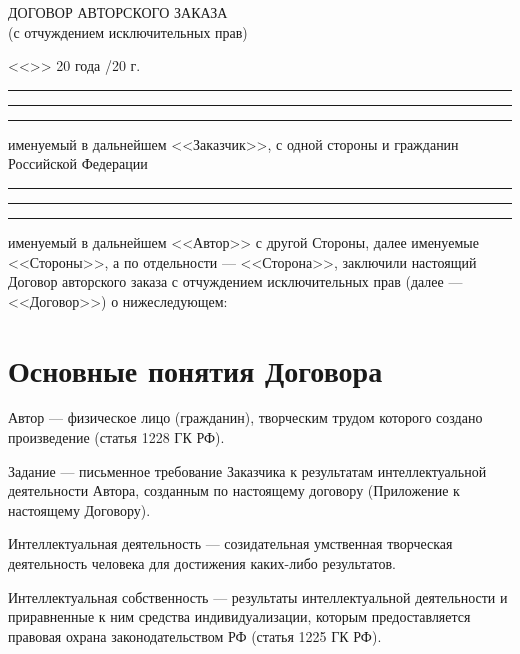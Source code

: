 \documentclass[12pt]{article}
\begin{document}
\begin{center}
{\Large \MakeUppercase{Договор авторского заказа} \\
(с отчуждением исключительных прав)}
\end{center}

\vspace{.5cm}

\noindent <<\underline{\hspace{0.75cm}}>> \underline{\hspace{3cm}} 20\underline{\hspace{0.75cm}} года /20\underline{\hspace{0.75cm}} г.  \underline{\hspace{3cm}}

\vspace{12pt}
\hrule height .1mm\vspace{12pt}
\hrule height .1mm\vspace{12pt}
\hrule height .1mm\vspace{12pt}

именуемый в дальнейшем <<Заказчик>>, с одной стороны и
гражданин Российской Федерации

\vspace{12pt}
\hrule height .1mm\vspace{12pt}
\hrule height .1mm\vspace{12pt}
\hrule height .1mm\vspace{12pt}

именуемый в дальнейшем <<Автор>> с другой Стороны, далее именуемые <<Стороны>>, а по отдельности --- <<Сторона>>,
заключили настоящий Договор авторского заказа с отчуждением исключительных прав (далее --- <<Договор>>) о нижеследующем:

\section*{Основные понятия Договора}

Автор --- физическое лицо (гражданин), творческим трудом которого создано произведение (статья 1228 ГК РФ).

Задание --- письменное требование Заказчика к результатам интеллектуальной деятельности Автора, созданным по настоящему договору (Приложение  к настоящему Договору).

Интеллектуальная деятельность --- созидательная умственная творческая деятельность человека для достижения каких-либо результатов.

Интеллектуальная собственность --- результаты интеллектуальной деятельности и приравненные к ним средства индивидуализации, которым предоставляется правовая охрана законодательством РФ (статья 1225 ГК РФ).
\end{document}
